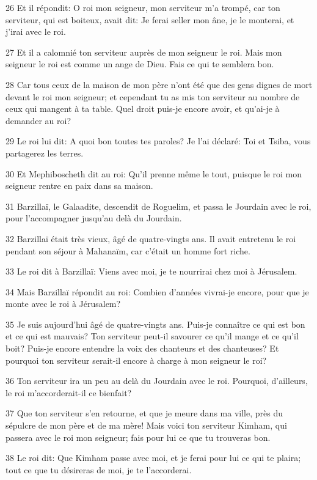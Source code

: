 \par 26 Et il répondit: O roi mon seigneur, mon serviteur m'a trompé, car ton serviteur, qui est boiteux, avait dit: Je ferai seller mon âne, je le monterai, et j'irai avec le roi.
\par 27 Et il a calomnié ton serviteur auprès de mon seigneur le roi. Mais mon seigneur le roi est comme un ange de Dieu. Fais ce qui te semblera bon.
\par 28 Car tous ceux de la maison de mon père n'ont été que des gens dignes de mort devant le roi mon seigneur; et cependant tu as mis ton serviteur au nombre de ceux qui mangent à ta table. Quel droit puis-je encore avoir, et qu'ai-je à demander au roi?
\par 29 Le roi lui dit: A quoi bon toutes tes paroles? Je l'ai déclaré: Toi et Tsiba, vous partagerez les terres.
\par 30 Et Mephiboscheth dit au roi: Qu'il prenne même le tout, puisque le roi mon seigneur rentre en paix dans sa maison.
\par 31 Barzillaï, le Galaadite, descendit de Roguelim, et passa le Jourdain avec le roi, pour l'accompagner jusqu'au delà du Jourdain.
\par 32 Barzillaï était très vieux, âgé de quatre-vingts ans. Il avait entretenu le roi pendant son séjour à Mahanaïm, car c'était un homme fort riche.
\par 33 Le roi dit à Barzillaï: Viens avec moi, je te nourrirai chez moi à Jérusalem.
\par 34 Mais Barzillaï répondit au roi: Combien d'années vivrai-je encore, pour que je monte avec le roi à Jérusalem?
\par 35 Je suis aujourd'hui âgé de quatre-vingts ans. Puis-je connaître ce qui est bon et ce qui est mauvais? Ton serviteur peut-il savourer ce qu'il mange et ce qu'il boit? Puis-je encore entendre la voix des chanteurs et des chanteuses? Et pourquoi ton serviteur serait-il encore à charge à mon seigneur le roi?
\par 36 Ton serviteur ira un peu au delà du Jourdain avec le roi. Pourquoi, d'ailleurs, le roi m'accorderait-il ce bienfait?
\par 37 Que ton serviteur s'en retourne, et que je meure dans ma ville, près du sépulcre de mon père et de ma mère! Mais voici ton serviteur Kimham, qui passera avec le roi mon seigneur; fais pour lui ce que tu trouveras bon.
\par 38 Le roi dit: Que Kimham passe avec moi, et je ferai pour lui ce qui te plaira; tout ce que tu désireras de moi, je te l'accorderai.
